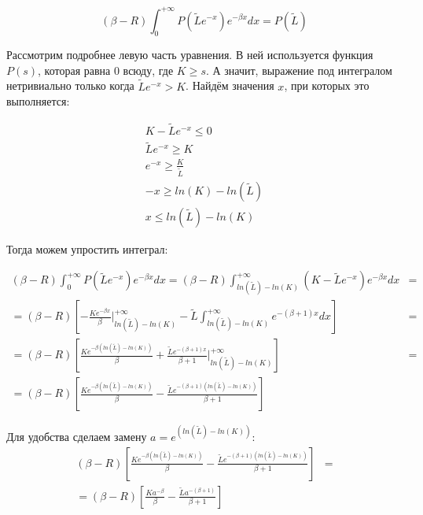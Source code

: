 \documentclass[a4paper,12pt]{article}
\theoremstyle{definition}
\begin{document}
\begin{equation*}
    (\beta - R) \int_{0}^{+\infty} P(\tilde{L} e^{-x}) e^{-\beta x} dx = P(\tilde{L})
\end{equation*}

Рассмотрим подробнее левую часть уравнения. В ней используется функция $P(s)$, которая равна 0 всюду, где $K \ge s$. А значит, выражение под интегралом нетривиально только когда $\tilde{L} e^{-x} > K$. Найдём значения $x$, при которых это выполняется:

\begin{gather*} 
K - \tilde{L} e^{-x} \le 0 \\ 
\tilde{L} e^{-x} \ge K \\
e^{-x} \ge \frac{K}{\tilde{L}} \\
-x \ge ln(K) - ln(\tilde{L}) \\
x \le ln(\tilde{L}) - ln(K)
\end{gather*}

Тогда можем упростить интеграл:

\begin{equation*}
\begin{split}
    (\beta - R) \int_{0}^{+\infty} P(\tilde{L} e^{-x}) e^{-\beta x} dx = (\beta - R) \int_{ln(\tilde{L}) - ln(K)}^{+\infty} (K - \tilde{L} e^{-x}) e^{-\beta x} dx &= \\
    = (\beta - R) \left[ - \frac{K e^{-\beta x}}{\beta} \bigg|_{ln(\tilde{L}) - ln(K)}^{+\infty} - \tilde{L} \int_{ln(\tilde{L}) - ln(K)}^{+\infty} e^{-(\beta + 1) x} dx \right] &= \\
    = (\beta - R) \left[ \frac{K e^{-\beta (ln(\tilde{L}) - ln(K))}}{\beta} + \frac{\tilde{L} e^{-(\beta + 1) x}}{\beta + 1} \bigg|_{ln(\tilde{L}) - ln(K)}^{+\infty} \right] &= \\
    = (\beta - R) \left[ \frac{K e^{-\beta (ln(\tilde{L}) - ln(K))}}{\beta} - \frac{\tilde{L} e^{-(\beta + 1) (ln(\tilde{L}) - ln(K))}}{\beta + 1} \right] %
\end{split}
\end{equation*}

Для удобства сделаем замену $a = e^{(ln(\tilde{L}) - ln(K))}$:
\begin{equation*}
    \begin{split}
        (\beta - R) \left[ \frac{K e^{-\beta (ln(\tilde{L}) - ln(K))}}{\beta} - \frac{\tilde{L} e^{-(\beta + 1) (ln(\tilde{L}) - ln(K))}}{\beta + 1} \right] &= \\
        = (\beta - R) \left[ \frac{K a^{-\beta}}{\beta} - \frac{\tilde{L} a^{-(\beta + 1)}}{\beta + 1} \right]
    \end{split}
\end{equation*}
\end{document}
